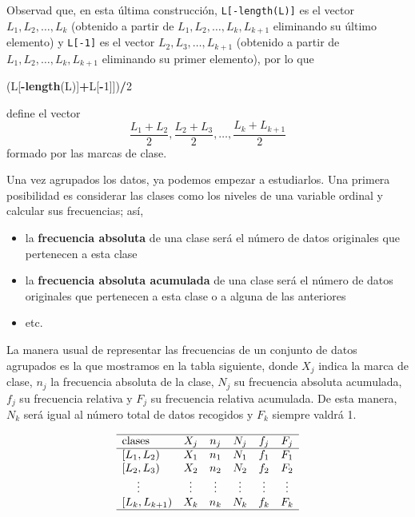 \documentclass[
]{book}
\newenvironment{Shaded}{\begin{snugshade}}{\end{snugshade}}
\newcommand{\DecValTok}[1]{\textcolor[rgb]{0.00,0.00,0.81}{#1}}
\newcommand{\KeywordTok}[1]{\textcolor[rgb]{0.13,0.29,0.53}{\textbf{#1}}}
\newcommand{\NormalTok}[1]{#1}
\newcommand{\OperatorTok}[1]{\textcolor[rgb]{0.81,0.36,0.00}{\textbf{#1}}}
\theoremstyle{definition}
\theoremstyle{definition}
\theoremstyle{definition}
\theoremstyle{remark}
\begin{document}
Observad que, en esta última construcción, \texttt{L{[}-length(L){]}} es el vector \(L_1,L_2,\ldots,L_k\) (obtenido a partir de \(L_1,L_2,\ldots,L_k,L_{k+1}\) eliminando su último elemento) y
\texttt{L{[}-1{]}} es el vector \(L_2,L_3,\ldots,L_{k+1}\) (obtenido a partir de \(L_1,L_2,\ldots,L_k,L_{k+1}\) eliminando su primer elemento), por lo que

\begin{Shaded}
\begin{Highlighting}[]
\NormalTok{(L[}\OperatorTok{{-}}\KeywordTok{length}\NormalTok{(L)]}\OperatorTok{+}\NormalTok{L[}\OperatorTok{{-}}\DecValTok{1}\NormalTok{]])}\OperatorTok{/}\DecValTok{2}
\end{Highlighting}
\end{Shaded}

define el vector
\[
\frac{L_1+L_2}{2},\frac{L_2+L_3}{2},\ldots,\frac{L_k+L_{k+1}}{2}
\]
formado por las marcas de clase.

Una vez agrupados los datos, ya podemos empezar a estudiarlos. Una primera posibilidad es considerar las clases como los niveles de una variable ordinal y calcular sus frecuencias; así,

\begin{itemize}
\item
  la \textbf{frecuencia absoluta} de una clase será el número de datos originales que pertenecen a esta clase
\item
  la \textbf{frecuencia absoluta acumulada} de una clase será el número de datos originales que pertenecen a esta clase o a alguna de las anteriores
\item
  etc.
\end{itemize}

La manera usual de representar las frecuencias de un conjunto de datos agrupados es la que mostramos en la tabla siguiente, donde \(X_j\) indica la marca de clase, \(n_j\) la frecuencia absoluta de la clase, \(N_j\) su frecuencia absoluta acumulada, \(f_j\) su frecuencia relativa y \(F_j\) su frecuencia relativa acumulada. De esta manera, \(N_k\) será igual al número total de datos recogidos y \(F_k\) siempre valdrá 1.

\[
\begin{array}{lccccc}
\hline \text{clases} & X_j &
n_j & N_j & f_j & F_j
\\\hline \left[L_1,L_2\right) & X_1 & n_1 & N_1 & f_1 & F_1 \\
\left[L_2,L_3\right) & X_2 & n_2 & N_2 & f_2 & F_2 \\
\quad\ \vdots & \vdots & \vdots & \vdots & \vdots & \vdots \\
\left[L_k,L_{k+1}\right) & X_k & n_k & N_k & f_k & F_k\\ \hline
\end{array}
\]
\end{document}

